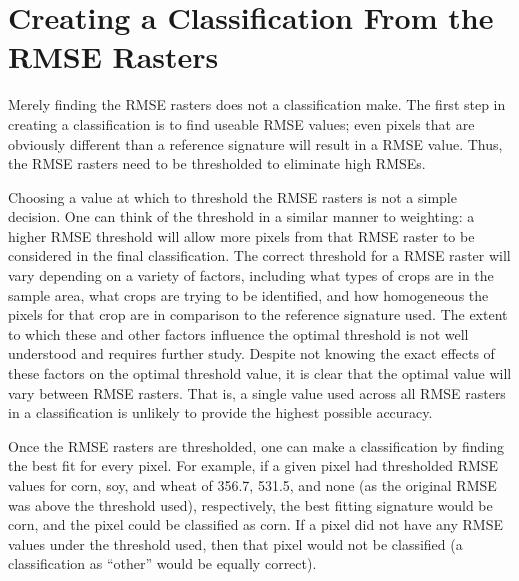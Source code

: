 \section{Creating a Classification From the RMSE Rasters}
\label{appendix:tools:classify}

Merely finding the RMSE rasters does not a classification make. The first step in creating a classification is to find useable RMSE values; even pixels that are obviously different than a reference signature will result in a RMSE value. Thus, the RMSE rasters need to be thresholded to eliminate high RMSEs.

Choosing a value at which to threshold the RMSE rasters is not a simple decision. One can think of the threshold in a similar manner to weighting: a higher RMSE threshold will allow more pixels from that RMSE raster to be considered in the final classification. The correct threshold for a RMSE raster will vary depending on a variety of factors, including what types of crops are in the sample area, what crops are trying to be identified, and how homogeneous the pixels for that crop are in comparison to the reference signature used. The extent to which these and other factors influence the optimal threshold is not well understood and requires further study. Despite not knowing the exact effects of these factors on the optimal threshold value, it is clear that the optimal value will vary between RMSE rasters. That is, a single value used across all RMSE rasters in a classification is unlikely to provide the highest possible accuracy.

Once the RMSE rasters are thresholded, one can make a classification by finding the best fit for every pixel. For example, if a given pixel had thresholded RMSE values for corn, soy, and wheat of 356.7, 531.5, and none (as the original RMSE was above the threshold used), respectively, the best fitting signature would be corn, and the pixel could be classified as corn. If a pixel did not have any RMSE values under the threshold used, then that pixel would not be classified (a classification as ``other'' would be equally correct).

